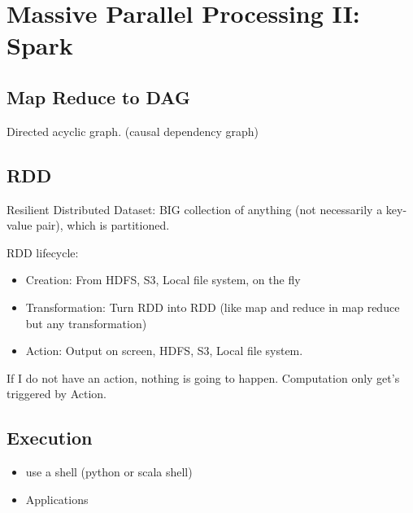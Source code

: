 \usepackage{textcomp}\section{Massive Parallel Processing II: Spark}


\subsection{Map Reduce to DAG}
Directed acyclic graph. (causal dependency graph)

\subsection{RDD}
Resilient Distributed Dataset: BIG collection of anything (not necessarily a key-value pair), which is partitioned.

RDD lifecycle:
\begin{itemize}
    \item Creation: From HDFS, S3, Local file system, on the fly
    \item Transformation: Turn RDD into RDD (like map and reduce in map reduce but any transformation)
    \item Action: Output on screen, HDFS, S3, Local file system.
\end{itemize}
If I do not have an action, nothing is going to happen. Computation only get's triggered by Action.

\subsection{Execution}
\begin{itemize}
    \item use a shell (python or scala shell)
    \item Applications
\end{itemize}

